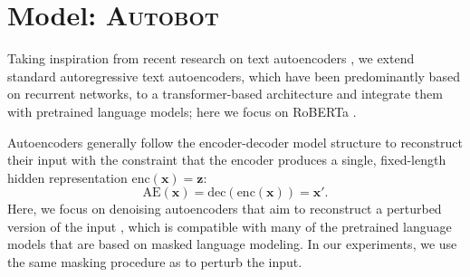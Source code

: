 
\section{Model: \textsc{Autobot}}\label{sec:model}
Taking inspiration from recent research on text autoencoders \citep{bowman2015generating,shen2019educating,mai2020plug}, we extend standard autoregressive text autoencoders, which have been predominantly based on recurrent networks, to a transformer-based architecture and integrate them with pretrained language models; here we focus on RoBERTa \cite{liu2019RoBERTa}.

Autoencoders generally follow the encoder-decoder model structure to reconstruct their input with the constraint that the encoder produces a single, fixed-length hidden representation $\text{enc}(\boldsymbol{x}) = \mathbf{z}$:
\begin{equation}
\text{AE}(\boldsymbol{x}) = \text{dec}(\text{enc}(\boldsymbol{x})) = \boldsymbol{x}'.
\end{equation}
\noindent Here, we focus on denoising autoencoders that aim to reconstruct a perturbed version of the input  \citep{vincent2010stacked,shen2019educating}, which is compatible with many of the pretrained language models that are based on masked language modeling. In our experiments, we use the same masking procedure as \citet{devlin-etal-2019-bert} to perturb the input.
